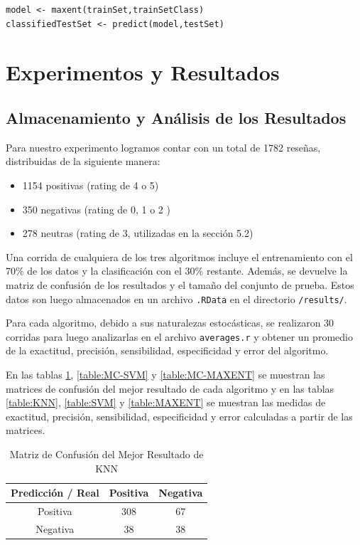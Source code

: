 \documentclass[hidelinks]{sig-alternate-05-2015}
\begin{document}
\lstset{language=R}
\begin{lstlisting}
model <- maxent(trainSet,trainSetClass)
classifiedTestSet <- predict(model,testSet)
\end{lstlisting}

\section{Experimentos y Resultados}

\subsection{Almacenamiento y Análisis de los Resultados}

Para nuestro experimento logramos contar con un total de 1782 reseñas, distribuidas de la siguiente manera:
\begin{itemize}

\item 1154 positivas (rating de 4 o 5)
\item 350 negativas (rating de 0, 1 o 2 )
\item 278 neutras (rating de 3, utilizadas en la sección 5.2)

\end{itemize}
Una corrida de cualquiera de los tres algoritmos incluye el entrenamiento con el 70\% de los datos y la clasificación con el 30\% restante. Además, se devuelve la matriz de confusión de los resultados y el tamaño del conjunto de prueba. Estos datos son luego almacenados en un archivo \texttt{.RData} en el directorio \texttt{/results/}. 

Para cada algoritmo, debido a sus naturalezas estocásticas, se realizaron 30 corridas para luego analizarlas en el archivo \texttt{averages.r} y obtener un promedio de la exactitud, precisión, sensibilidad, especificidad y error del algoritmo.

En las tablas \ref{table:MC-KNN}, \ref{table:MC-SVM} y \ref{table:MC-MAXENT} se muestran las matrices de confusión del mejor resultado de cada algoritmo y en las tablas \ref{table:KNN}, \ref{table:SVM} y \ref{table:MAXENT} se muestran las medidas de exactitud, precisión, sensibilidad, especificidad y error calculadas a partir de las matrices.

\begin{table}[H]
\centering
\caption{Matriz de Confusión del Mejor Resultado de KNN}
\begin{tabular}{|c|c|c|} 					\hline
Predicción / Real	& Positiva 	& Negativa 	\\ \hline
Positiva 			& 308 		& 67 		\\ \hline
Negativa 			& 38 		& 38		\\
\hline\end{tabular}
\label{table:MC-KNN}
\end{table}
\end{document}
